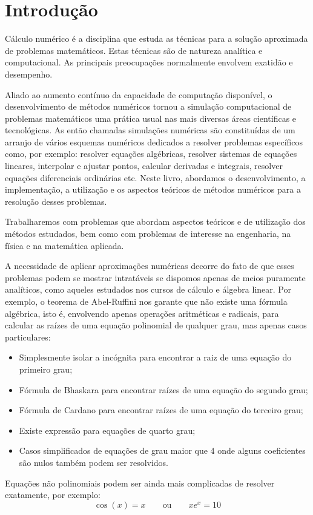
%

\chapter{Introdução}

Cálculo numérico é a disciplina que estuda as técnicas para a solução aproximada de problemas matemáticos. Estas técnicas são de natureza analítica e computacional. As principais preocupações normalmente envolvem exatidão e desempenho. 

Aliado ao aumento contínuo da capacidade de computação disponível, o desenvolvimento de métodos numéricos tornou a simulação computacional de problemas matemáticos uma prática usual nas mais diversas áreas científicas e tecnológicas. As então chamadas simulações numéricas são constituídas de um arranjo de vários esquemas numéricos dedicados a resolver problemas específicos como, por exemplo: resolver equações algébricas, resolver sistemas de equações lineares, interpolar e ajustar pontos, calcular derivadas e integrais, resolver equações diferenciais ordinárias etc. Neste livro, abordamos o desenvolvimento, a implementação, a utilização e os aspectos teóricos de métodos numéricos para a resolução desses problemas.

Trabalharemos com problemas que abordam aspectos teóricos e de utilização dos métodos estudados, bem como com problemas de interesse na engenharia, na física e na matemática aplicada. 

A necessidade de aplicar aproximações numéricas decorre do fato de que esses problemas podem se mostrar intratáveis se dispomos apenas de meios puramente analíticos, como aqueles estudados nos cursos de cálculo e álgebra linear. Por exemplo, o teorema de Abel-Ruffini nos garante que não existe uma fórmula algébrica, isto é, envolvendo apenas operações aritméticas e radicais, para calcular as raízes de uma equação polinomial de qualquer grau, mas apenas casos particulares:
\begin{itemize}
\item Simplesmente isolar a incógnita para encontrar a raiz de uma equação do primeiro grau;
\item Fórmula de Bhaskara para encontrar raízes de uma equação do segundo grau;
\item Fórmula de Cardano para encontrar raízes de uma equação do terceiro grau;
\item Existe expressão para equações de quarto grau;
\item Casos simplificados de equações de grau maior que 4 onde alguns coeficientes são nulos também podem ser resolvidos.
\end{itemize}
Equações não polinomiais podem ser ainda mais complicadas de resolver exatamente, por exemplo:
$$
\cos(x)=x\qquad \text{ou}\qquad xe^x= 10
$$

